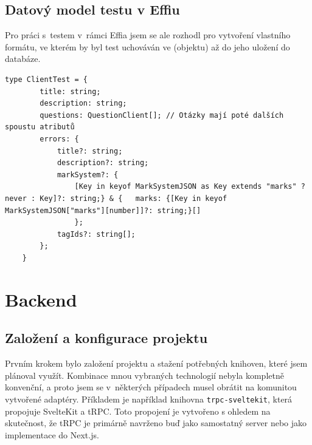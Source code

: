 \documentclass[12pt, a4paper,
openright
]{report}
\begin{document}
\subsection{Datový model testu v Effiu}
Pro práci s~testem v~rámci Effia jsem se ale rozhodl pro vytvoření vlastního formátu, ve kterém by byl test uchováván ve  (objektu) až do jeho uložení do databáze.

\begin{lstlisting}[style=ES6, caption=Ukázka z +page.server.ts, label=test_format]
	type ClientTest = {
		title: string;
		description: string;
		questions: QuestionClient[]; // Otázky mají poté dalších spoustu atributů
		errors: {
			title?: string;
			description?: string;
			markSystem?: {
				[Key in keyof MarkSystemJSON as Key extends "marks" ? never : Key]?: string;} & {	marks: {[Key in keyof MarkSystemJSON["marks"][number]]?: string;}[]
				};
			tagIds?: string[];
		};
	}
\end{lstlisting}

\section{Backend}

\subsection{Založení a konfigurace projektu}
Prvním krokem bylo založení projektu a stažení potřebných knihoven, které jsem plánoval využít. Kombinace mnou vybraných technologií nebyla kompletně konvenční, a proto jsem se v~některých případech musel obrátit na komunitou vytvořené adaptéry. Příkladem je například knihovna \texttt{trpc-sveltekit}, která propojuje SvelteKit a tRPC. Toto propojení je vytvořeno s ohledem na skutečnost, že tRPC je primárně navrženo buď jako samostatný server nebo jako implementace do Next.js.
\end{document}
